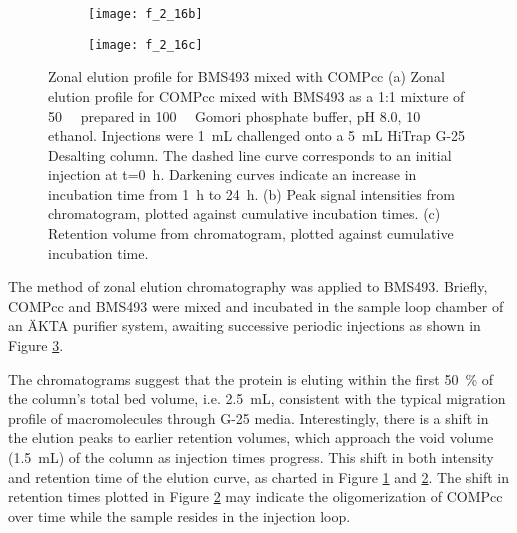\begin{refsection}
\begin{figure}[h!]
    \begin{subfigure}[b]{0.5\textwidth}
        \texttt{[image: f\_2\_16b]}
        \caption{}
        \label{fig:ze_intensity}
    \end{subfigure}
    \begin{subfigure}[b]{0.45\textwidth}
        \texttt{[image: f\_2\_16c]}
        \caption{}
        \label{fig:ze_retention_times}
    \end{subfigure} \caption{Zonal elution profile for BMS493 mixed with
    COMPcc (a) Zonal elution profile for COMPcc mixed with BMS493 as a 1:1
        mixture of \SI{50}{\micro\moLar} prepared in \SI{100}{\milli\moLar}
        Gomori phosphate buffer, pH 8.0, \SI{10}{\volper} ethanol. Injections
        were \SI{1}{\mL} challenged onto a \SI{5}{\mL} HiTrap G-25 Desalting column.
        The dashed line curve corresponds to an initial injection at
        t=\SI{0}{\hour}. Darkening curves indicate an increase in incubation
        time from \SI{1}{\hour} to \SI{24}{\hour}. (b) Peak signal intensities
        from chromatogram, plotted against cumulative incubation times. (c)
        Retention volume from chromatogram, plotted against cumulative
        incubation time.
    }\label{fig:zonal_elution_report}
\end{figure}
The method of zonal elution chromatography was applied to BMS493. Briefly,
COMPcc and BMS493 were mixed and incubated in the sample loop chamber of an
\"{A}KTA purifier system, awaiting successive periodic injections as shown in
Figure \ref{fig:zonal_elution_report}. 

The chromatograms suggest that the protein is eluting within the first
\SI{50}{\percent} of the column's total bed volume, i.e. \SI{2.5}{\mL},
consistent with the typical migration profile of macromolecules through G-25
media.  Interestingly, there is a shift in the elution peaks to earlier
retention volumes, which approach the void volume (\SI{1.5}{\mL}) of the column
as injection times progress. This shift in both intensity and retention time of
the elution curve, as charted in Figure \ref{fig:ze_intensity} and
\ref{fig:ze_retention_times}. The shift in retention times plotted in Figure
\ref{fig:ze_retention_times} may indicate the oligomerization of COMPcc over time
while the sample resides in the injection loop.


\end{refsection}
